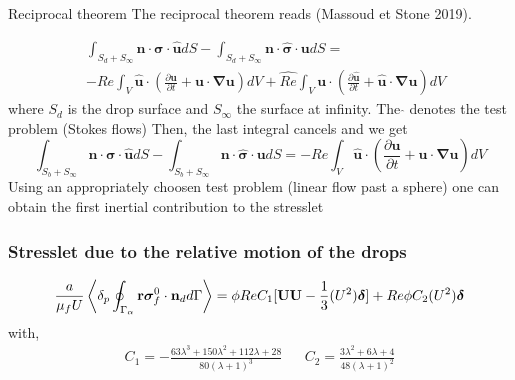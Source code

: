 \documentclass{sintefbeamer}
\begin{document}
\begin{frame}{Reciprocal theorem}
\small
  The reciprocal theorem reads (Massoud et Stone 2019).

\begin{align}
 &\int_{S_d+S_\infty} \bm n \cdot \bm \sigma \cdot \hat{ \bm {u}}dS -  \int_{S_d+S_\infty} \bm n \cdot \hat {\bm \sigma} \cdot  \bm {u}dS = \\
 &-Re\int_{V} \hat{ \bm {u}} \cdot \left(\frac{\partial \bm u}{\partial t}+\bm u  \cdot\bm\nabla \bm u \right)dV+\hat{Re}\int_{V} \bm u \cdot \left(\frac{\partial \hat{\bm u}}{\partial t}+\hat{\bm u}  \cdot\bm\nabla \hat{\bm u}\right)dV
\end{align}
where $S_d$ is the drop surface and $S_\infty$ the surface at infinity. The $\hat{}$ denotes the test problem (Stokes flows)
Then, the last integral cancels and we get 
\begin{equation}
    \int_{S_b+S_\infty} \bm n \cdot \bm \sigma \cdot \hat{ \bm {u}}dS -  \int_{S_b+S_\infty} \bm n \cdot \hat {\bm \sigma} \cdot  \bm {u}dS = 
    -Re\int_{V} \hat{ \bm {u}} \cdot \left(\frac{\partial \bm u}{\partial t}+\bm u  \cdot\bm\nabla \bm u \right)dV
    \label{eq:reciprocal}
\end{equation}
Using an appropriately choosen test problem (linear flow past a sphere) one can obtain the first inertial contribution to the stresslet

\end{frame}

\begin{frame}
  \frametitle{Stresslet due to the relative motion of the drops}
  \begin{multline}
    \frac{a}{\mu_f U}
        \left<\delta_p \oint_{\Gamma_{\alpha}} \textbf{r}\bm{\sigma}_f^0 \cdot \textbf{n}_d d\Gamma\right>
    =
     \phi Re C_1
    [
        \textbf{UU} - \frac{1}{3}(U^2)\bm\delta 
    ]
    + Re \phi C_2 (U^2) \bm\delta
    \label{eq:stresslet_trans}
\end{multline} 
with, 
\begin{align}
    C_1  =  -\frac{63 \lambda^{3} + 150 \lambda^{2} + 112 \lambda + 28}{80 \left(\lambda + 1\right)^{3}}
    &&
    C_2  = \frac{3\lambda^2 + 6\lambda + 4}{48(\lambda +1 )^2}
\end{align}

\end{frame}
\end{document}
